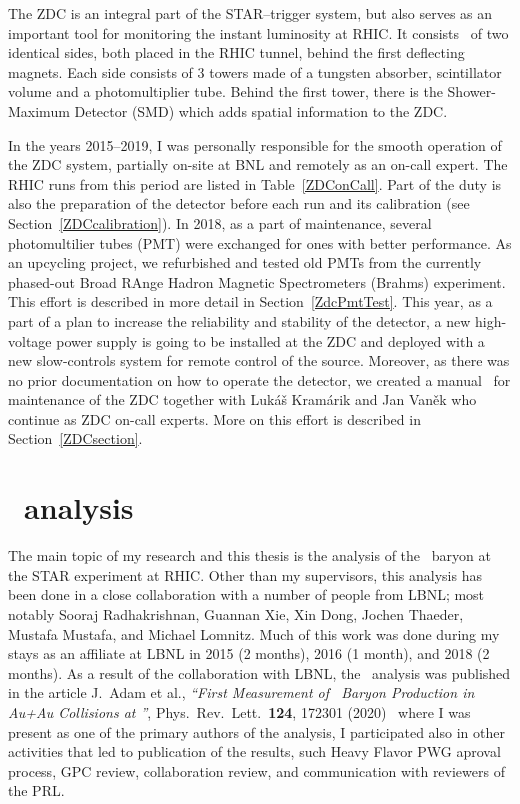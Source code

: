 The ZDC is an integral part of the STAR--trigger system, but also serves as an important tool for monitoring the instant luminosity at RHIC\@. It consists~\cite{ZDC, ZDCSMD} of two identical sides, both placed in the RHIC tunnel, behind 
the first deflecting magnets. Each side consists of 3 towers made of a tungsten absorber, scintillator volume and a photomultiplier tube.
Behind the first tower, there is the Shower-Maximum Detector (SMD) which adds spatial information to the ZDC\@.

In the years 2015--2019, I was personally responsible for the smooth operation of the ZDC system, partially on-site at BNL and remotely as an on-call expert. The RHIC runs from this period are listed in Table~\ref{ZDConCall}\@. Part of the duty is also the preparation of the detector before each run and its calibration (see Section~\ref{ZDCcalibration}). In 2018, as a part of  maintenance, several photomultilier tubes (PMT) were exchanged for ones with better performance. As an upcycling project, we refurbished and tested old PMTs from the currently phased-out Broad RAnge Hadron Magnetic Spectrometers (Brahms) experiment. This effort is described in more detail in Section~\ref{ZdcPmtTest}\@. This year, as a part of a plan to increase the reliability and stability of the detector, a new high-voltage power supply is going to be installed at the ZDC and deployed with a new slow-controls system for remote control of the source. Moreover, as there was no prior documentation on how to operate the detector, we created a manual~\cite{ZDCmanual} for maintenance of the ZDC together with Lukáš Kramárik and Jan Vaněk who continue as ZDC on-call experts. More on this effort is described in Section~\ref{ZDCsection}\@.

\section*{\Lambdac\ analysis}
The main topic of my research and this thesis is the analysis of the \Lambdac\ baryon at the STAR experiment at RHIC\@. Other than my supervisors, this analysis has been done in a close collaboration with a number of people from LBNL; most notably Sooraj Radhakrishnan, Guannan Xie, Xin Dong, Jochen Thaeder, Mustafa Mustafa, and Michael Lomnitz. Much of this work was done during my stays as an affiliate at LBNL in 2015 (2 months), 2016 (1 month), and 2018 (2 months)\@. 
As a result of the collaboration with LBNL, the \Lambdac\ analysis was published in the article J.\ Adam et al., \emph{``First Measurement of \Lambdac\ Baryon Production in Au+Au Collisions at \snnFull''}, Phys.\ Rev.\ Lett.\ \textbf{124}, 172301 (2020)~\cite{LambdacPaper} where I was present as one of the primary authors of the analysis, I participated also in other activities that led to publication of the results, such Heavy Flavor PWG aproval process, GPC review, collaboration review, and communication with reviewers of the PRL\@.

